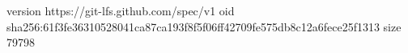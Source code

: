 version https://git-lfs.github.com/spec/v1
oid sha256:61f3fe36310528041ca87ca193f8f5f06ff42709fe575db8c12a6fece25f1313
size 79798
